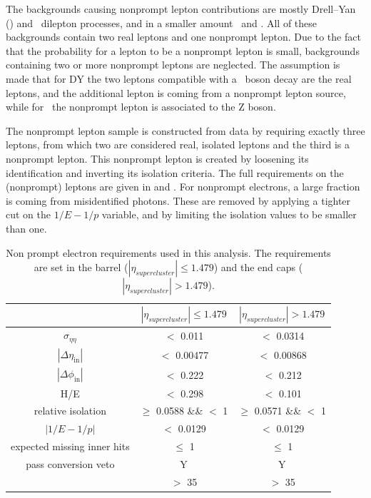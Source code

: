 The backgrounds causing nonprompt lepton contributions are mostly Drell--Yan (\DY) and \ttbar\ dilepton processes, and in a smaller amount \WW\ and \tWZ. All of these backgrounds contain two real leptons and one nonprompt lepton. Due to the fact that the probability for a lepton to be a nonprompt lepton is small, backgrounds containing two or more nonprompt leptons are neglected. The assumption is made that for DY the two leptons compatible with a \PZ\ boson decay are the real leptons, and the additional lepton is coming from a nonprompt lepton source, while for \ttbar\ the nonprompt lepton is associated to the Z boson. 

The nonprompt lepton sample is constructed from data by requiring exactly three leptons, from which two are considered real, isolated leptons and the third is a nonprompt lepton. This nonprompt lepton is created by loosening its identification and inverting its isolation criteria. The full requirements on the (nonprompt) leptons are given in   and .  For nonprompt electrons, a large fraction is coming from misidentified photons. These are removed by applying a tighter cut on the $1/E-1/p$ variable, and by limiting the isolation values to be smaller than one. 
\begin{table}[htbp]
	\centering
	
	\caption{Non prompt electron requirements used in this analysis. The requirements are set in the barrel ($|\eta_{supercluster}| \leq 1.479$)
		and the end caps ($|\eta_{supercluster}| > 1.479$). }
	\begin{tabular}{ccc}
		\toprule
		& \multicolumn{1}{c|}{$|\eta_{supercluster}| \leq 1.479$ } & \multicolumn{1}{c}{$|\eta_{supercluster}| > 1.479$ } \\
		\midrule
		$\sigma_{\eta \eta}$ & $<$ 0.011 & $<$ 0.0314 \\ 
		
		$|\Delta\eta_{\mathrm{in}}|$ & $<$ 0.00477& $<$ 0.00868\\ 
		
		$|\Delta\phi_{\mathrm{in}}|$ & $<$ 0.222 &  $<$ 0.212 \\ 
		 
		H/E & $<$ 0.298& $<$ 0.101 \\ 
		
		relative isolation & $\geq$ 0.0588 \&\& $<$ 1 &  $\geq$ 0.0571 \&\& $<$ 1\\ 
	
		$|1/E-1/p|$ & $<$ 0.0129 \GeVinv & $<$ 0.0129 \GeVinv \\ 
		
		expected missing inner hits & $\leq $ 1 &  $\leq $ 1\\ 
	
		pass conversion veto & Y & Y \\ 
	
		\pt &$>$ 35 \GeV & $>$ 35 \GeV \\
		\bottomrule
	\end{tabular} 
	\label{tab:nonpromptel}
\end{table}

